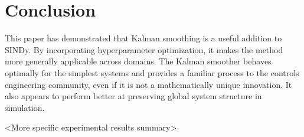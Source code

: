 \documentclass{article}
\begin{document}
\section{Conclusion}
This paper has demonstrated that Kalman smoothing is a useful addition to SINDy.  By incorporating hyperparameter optimization, it makes the method more generally applicable across domains. The Kalman smoother behaves optimally for the simplest systems and provides a familiar process to the controls engineering community, even if it is not a mathematically unique innovation.  It also appears to perform better at preserving global system structure in simulation.

<More specific experimental results summary>
\end{document}
